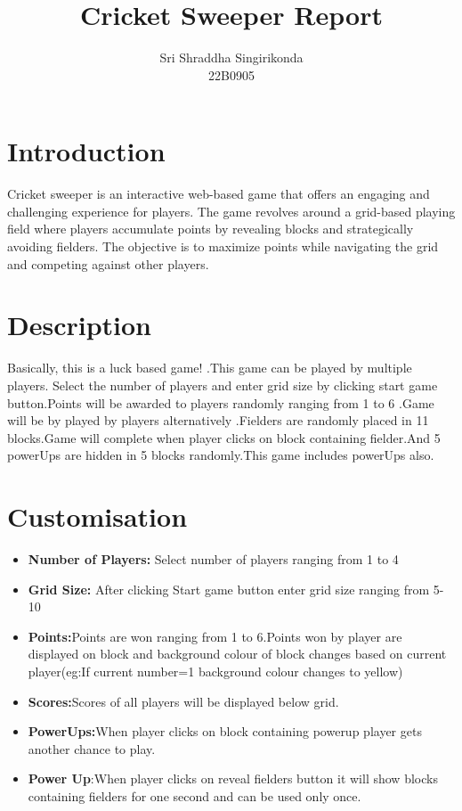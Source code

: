 \documentclass{article}
\title{\textbf{Cricket Sweeper Report}}
\author{Sri Shraddha Singirikonda \\ 22B0905}
\date{}
\begin{document}
\maketitle
\tableofcontents
\clearpage
\section{Introduction}
     Cricket sweeper is an interactive web-based game that offers an engaging and challenging experience for players. The game revolves around a grid-based playing field where players accumulate points by revealing blocks and strategically avoiding fielders. The objective is to maximize points while navigating the grid and competing against other players.
\section{Description}
    Basically, this is a luck based game! .This game can be played by multiple players. Select the number of players and enter grid size by clicking start game button.Points will be awarded to players randomly ranging from 1 to 6 .Game will be by played by players alternatively .Fielders are randomly placed in 11 blocks.Game will complete when player clicks on block containing fielder.And 5 powerUps are hidden in 5 blocks randomly.This game includes powerUps also. 
\section{Customisation}    
\begin{itemize}
    \item \textbf{Number of Players:} Select number of players ranging from 1 to 4
    \item \textbf{Grid Size:} After clicking Start game button enter grid size ranging from 5-10
    \item \textbf{Points:}Points are won ranging from 1 to 6.Points won by player are displayed on block and background colour of block changes based on current player(eg:If current number=1 background colour changes to yellow)
    \item \textbf{Scores:}Scores of all players will be displayed below grid.
    \item \textbf{PowerUps:}When player clicks on block containing powerup player gets another chance to play.
    \item \textbf{Power Up}:When player clicks on reveal fielders button it will show blocks containing fielders for one second and can be used only once.
    
\end{itemize}
\end{document}

